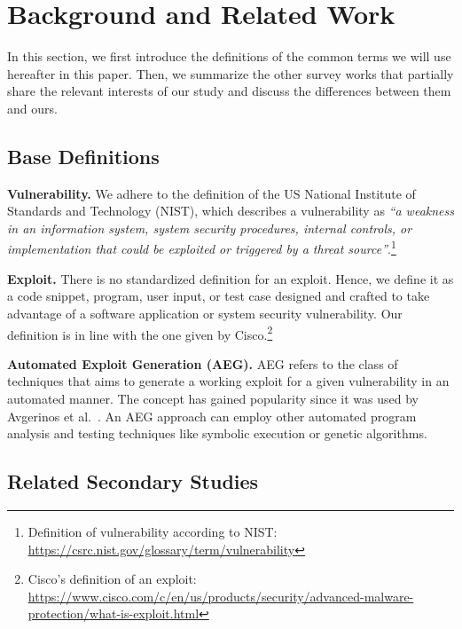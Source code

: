 \section{Background and Related Work}
\label{sec:background}
In this section, we first introduce the definitions of the common terms we will use hereafter in this paper. Then, we summarize the other survey works that partially share the relevant interests of our study and discuss the differences between them and ours.

\subsection{Base Definitions}
\label{subsec:definitions}
\noindent\textbf{Vulnerability.} We adhere to the definition of the US National Institute of Standards and Technology (NIST), which describes a vulnerability as \textit{``a weakness in an information system, system security procedures, internal controls, or implementation that could be exploited or triggered by a threat source''}.\footnote{Definition of vulnerability according to NIST: \url{https://csrc.nist.gov/glossary/term/vulnerability}}

\noindent\textbf{Exploit.} There is no standardized definition for an exploit. Hence, we define it as a code snippet, program, user input, or test case designed and crafted to take advantage of a software application or system security vulnerability. Our definition is in line with the one given by Cisco.\footnote{Cisco's definition of an exploit: \url{https://www.cisco.com/c/en/us/products/security/advanced-malware-protection/what-is-exploit.html}}

\noindent\textbf{Automated Exploit Generation (AEG).} AEG refers to the class of techniques that aims to generate a working exploit for a given vulnerability in an automated manner.
The concept has gained popularity since it was used by Avgerinos et al.~\cite{avgerinos2014automatic}.
An AEG approach can employ other automated program analysis and testing techniques like symbolic execution or genetic algorithms.
{}
{}


\subsection{Related Secondary Studies}
\label{subsec:related}

